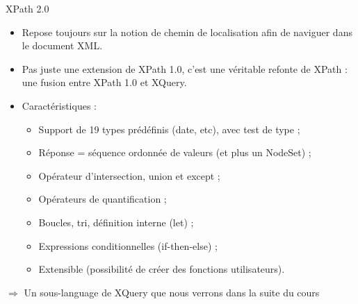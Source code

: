 \begin{frame}{XPath 2.0}

 \begin{itemize}
 \item Repose toujours sur la notion de chemin de localisation afin de naviguer dans le document XML.
\item Pas juste une extension de XPath 1.0, c'est une véritable refonte de XPath : une fusion entre XPath 1.0 et XQuery.
\item Caractéristiques :
\begin{itemize}
\item Support de 19 types prédéfinis (date, etc), avec test de type ;
\item Réponse = séquence ordonnée de valeurs (et plus un NodeSet) ; 
\item Opérateur d'intersection, union et except ;
\item Opérateurs de quantification ;
\item Boucles, tri, définition interne (let) ;
\item Expressions conditionnelles (if-then-else) ;
\item Extensible (possibilité de créer des fonctions utilisateurs).
\end{itemize}
 \end{itemize}

 $\Rightarrow$ Un sous-language de XQuery que nous verrons dans la suite du cours

\end{frame}





